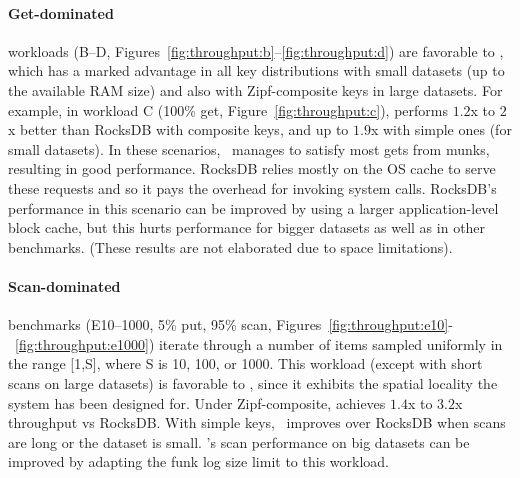 \paragraph{ Get-dominated} 
workloads (B--D, Figures~\ref{fig:throughput:b}--\ref{fig:throughput:d}) are 
favorable to 
\sys, which has a marked advantage in all key distributions with small datasets (up to the available RAM size) 
and also with Zipf-composite keys in large datasets. 
For example, in workload C (100\% get, Figure~\ref{fig:throughput:c}), 
\sys\/ performs $1.2$x to $2$x better than RocksDB with composite keys,
and up to $1.9$x  with simple ones (for small datasets). 
In these scenarios, \sys\  manages to satisfy most gets from munks, resulting in good performance.
RocksDB relies mostly on the OS cache to serve these requests and so it pays the overhead for invoking system calls. 
RocksDB's performance in this scenario can be improved by 
using a larger application-level block cache,
but this hurts performance for bigger datasets as well as in other benchmarks.
(These results are not elaborated due to space limitations). 

\paragraph{ Scan-dominated} benchmarks (E10--1000,  5\% put, 95\% scan, Figures~\ref{fig:throughput:e10}-~\ref{fig:throughput:e1000})
iterate through a number of items 
sampled uniformly in the range [1,S], where S is  10, 100, or 1000. 
This workload (except with short scans on  large datasets) is favorable to \sys, 
since it exhibits the spatial locality the system has been designed for. 
Under Zipf-composite, \sys\/ achieves $1.4$x to $3.2$x throughput vs RocksDB.   
With simple keys, \sys\ improves over RocksDB when scans are long or the dataset is small. 
\sys's scan performance on big datasets can be improved by adapting the funk log size limit to this workload. 
 

